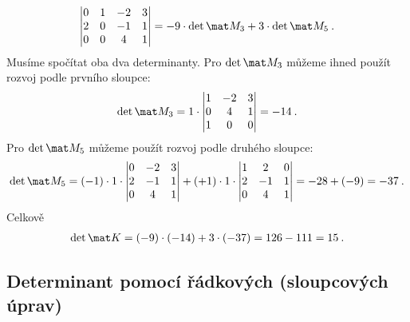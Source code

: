 \begin{itemize}
\begin{example}
\begin{align}
\begin{vmatrix}
                0 & 1  & -2 & 3 \\
                2 & 0  & -1 & 1 \\
                0 & 0  & 4 & 1
            \end{vmatrix}
            = -9 \cdot \det \mat M_3 + 3 \cdot \det \mat M_5 \:.
        \end{align}
        Musíme spočítat oba dva determinanty. Pro $\det \mat M_3$ můžeme ihned použít rozvoj podle prvního sloupce:
        \begin{align}
            \det \mat M_3 = 1 \cdot
            \begin{vmatrix}
                 1 & -2 & 3 \\
                 0 & 4 & 1 \\
                 1 & 0 & 0
            \end{vmatrix}
            =  -14 \:.
        \end{align}
        Pro $\det \mat M_5$ můžeme použít rozvoj podle druhého sloupce:
        \begin{align}
            \det \mat M_5 = (-1) \cdot 1 \cdot \begin{vmatrix}
                0 & -2 & 3 \\
                2 & -1 & 1 \\
                0 & 4 & 1
            \end{vmatrix}
            + (+1) \cdot 1 \cdot
            \begin{vmatrix}
                1 & 2 & 0 \\
                2 & -1 & 1 \\
                0 & 4 & 1
            \end{vmatrix}
            =
            -28 + (-9) = -37 \:.
        \end{align}
        Celkově
        \begin{align}
            \det \mat K = (-9) \cdot (-14) + 3 \cdot (-37) = 126 - 111 = 15 \:.
        \end{align}
    \end{example}
\end{itemize}

\subsection*{Determinant pomocí řádkových (sloupcových úprav)}

